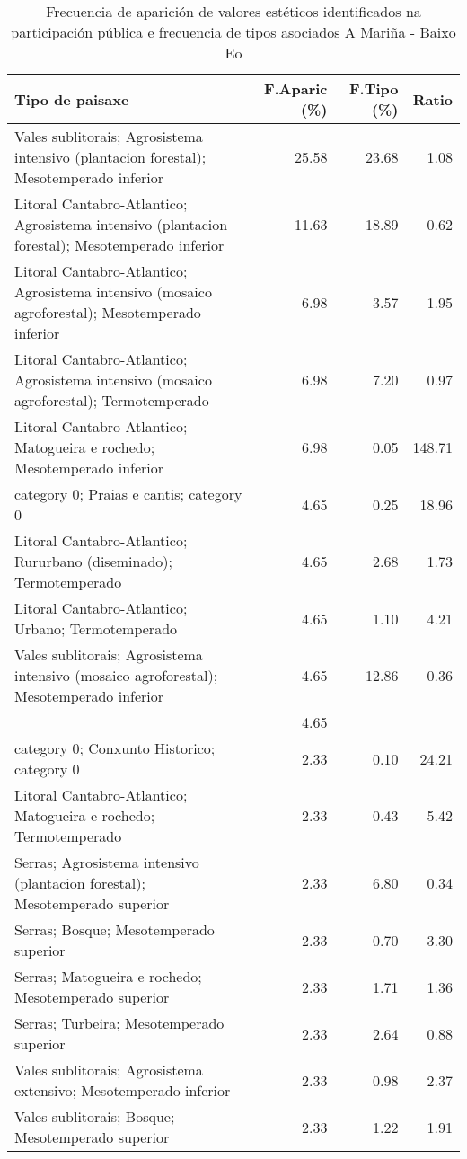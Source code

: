\begin{table}[p]
\centering
\caption{Frecuencia de aparición de valores estéticos identificados na participación pública e frecuencia de tipos asociados A Mariña - Baixo Eo} 
\label{vsixotest2}
\begin{tabular}{lrrr}
  \hline
Tipo de paisaxe & F.Aparic (\%) & F.Tipo (\%) & Ratio \\ 
  \hline
Vales sublitorais; Agrosistema intensivo (plantacion forestal); Mesotemperado inferior & 25.58 & 23.68 & 1.08 \\ 
  Litoral Cantabro-Atlantico; Agrosistema intensivo (plantacion forestal); Mesotemperado inferior & 11.63 & 18.89 & 0.62 \\ 
  Litoral Cantabro-Atlantico; Agrosistema intensivo (mosaico agroforestal); Mesotemperado inferior & 6.98 & 3.57 & 1.95 \\ 
  Litoral Cantabro-Atlantico; Agrosistema intensivo (mosaico agroforestal); Termotemperado & 6.98 & 7.20 & 0.97 \\ 
  Litoral Cantabro-Atlantico; Matogueira e rochedo; Mesotemperado inferior & 6.98 & 0.05 & 148.71 \\ 
  category 0; Praias e cantis; category 0 & 4.65 & 0.25 & 18.96 \\ 
  Litoral Cantabro-Atlantico; Rururbano (diseminado); Termotemperado & 4.65 & 2.68 & 1.73 \\ 
  Litoral Cantabro-Atlantico; Urbano; Termotemperado & 4.65 & 1.10 & 4.21 \\ 
  Vales sublitorais; Agrosistema intensivo (mosaico agroforestal); Mesotemperado inferior & 4.65 & 12.86 & 0.36 \\ 
   & 4.65 &  &  \\ 
  category 0; Conxunto Historico; category 0 & 2.33 & 0.10 & 24.21 \\ 
  Litoral Cantabro-Atlantico; Matogueira e rochedo; Termotemperado & 2.33 & 0.43 & 5.42 \\ 
  Serras; Agrosistema intensivo (plantacion forestal); Mesotemperado superior & 2.33 & 6.80 & 0.34 \\ 
  Serras; Bosque; Mesotemperado superior & 2.33 & 0.70 & 3.30 \\ 
  Serras; Matogueira e rochedo; Mesotemperado superior & 2.33 & 1.71 & 1.36 \\ 
  Serras; Turbeira; Mesotemperado superior & 2.33 & 2.64 & 0.88 \\ 
  Vales sublitorais; Agrosistema extensivo; Mesotemperado inferior & 2.33 & 0.98 & 2.37 \\ 
  Vales sublitorais; Bosque; Mesotemperado superior & 2.33 & 1.22 & 1.91 \\ 
   \hline
\end{tabular}
\end{table}
